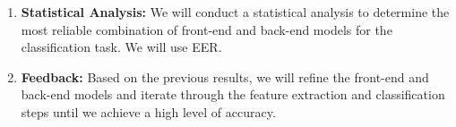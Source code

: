 \begin{enumerate}
    \item \textbf{Statistical Analysis:} We will conduct a statistical analysis to determine the most reliable combination of front-end and back-end models for the classification task. We will use \ac{EER}. %
    \item \textbf{Feedback:} Based on the previous results, we will refine the front-end and back-end models and iterate through the feature extraction and classification steps until we achieve a high level of accuracy.
\end{enumerate}



\endinput
